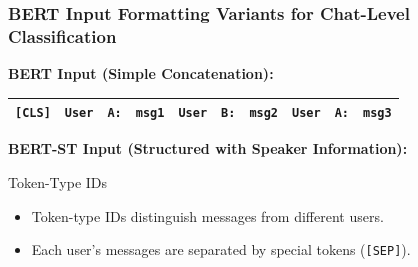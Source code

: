 \documentclass[aspectratio=169]{beamer}
\begin{document}
\begin{frame}
  \frametitle{BERT Input Formatting Variants for Chat-Level Classification}
  \small
    \textbf{BERT Input (Simple Concatenation):}
    \begin{center}
      \begin{tabular}{|c|c|c|c|c|c|c|c|c|c|}
        \hline
        \texttt{[CLS]} & \texttt{User} & \texttt{A:} & \texttt{msg1} & \texttt{User} & \texttt{B:} & \texttt{msg2} & \texttt{User} & \texttt{A:} & \texttt{msg3} \\
        \hline
      \end{tabular}
    \end{center}
    
    \vspace{0.5cm}
    \textbf{BERT-ST Input (Structured with Speaker Information):}
    \begin{center}
    \end{center}
    
    \vspace{0.3cm}
    \begin{block}{Token-Type IDs}
      \begin{itemize}
        \item Token-type IDs distinguish messages from different users.
        \item Each user's messages are separated by special tokens (\texttt{[SEP]}).
      \end{itemize}
    \end{block}
\end{frame}

  
\end{document}
